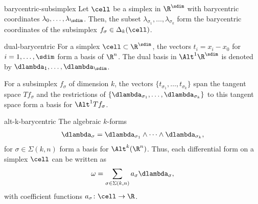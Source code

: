 \begin{Lemma}{barycentric-subsimplex}
  Let $\cell$ be a simplex in $\R^\sdim$ with barycentric coordinates
  $\lambda_0,\dots,\lambda_\sdim$. Then, the subset
  $\lambda_{\sigma_1},\dots,\lambda_{\sigma_k}$ form the barycentric
  coordinates of the subsimplex $f_\sigma\in\Delta_k(\cell)$.
\end{Lemma}

\begin{Notation}{dual-barycentric}
  For a simplex $\cell\subset \R^\sdim$, the vectors $t_i = x_i-x_0$
  for $i=1,\dots,\sdim$ form a basis of $\R^n$. The dual basis in
  $\Alt^1\R^\sdim$ is denoted by $\dlambda_1,\dots,\dlambda_\sdim$.

  For a subsimplex $f_\sigma$ of dimension $k$, the vectors
  $\{t_{\sigma_1},\dots,t_{\sigma_k}\}$ span the tangent space
  $Tf_\sigma$ and the restrictions of $\{\dlambda_{\sigma_1},\dots,\dlambda_{\sigma_k}\}$ to this tangent space form a basis for $\Alt^1Tf_\sigma$.
\end{Notation}

\begin{Notation}{alt-k-barycentric}
  The algebraic $k$-forms
  \begin{gather}
    \dlambda_\sigma = \dlambda_{\sigma_1}\wedge\dots\wedge\dlambda_{\sigma_k},
  \end{gather}
  for $\sigma\in\Sigma(k,n)$ form a basis for $\Alt^k(\R^n)$. Thus,
  each differential form on a simplex $\cell$ can be written as
  \begin{gather}
    \omega = \sum_{\sigma\in\Sigma(k,n)} a_\sigma \dlambda_\sigma,
  \end{gather}
  with coefficient functions $a_\sigma\colon \cell\to \R$.
\end{Notation}



